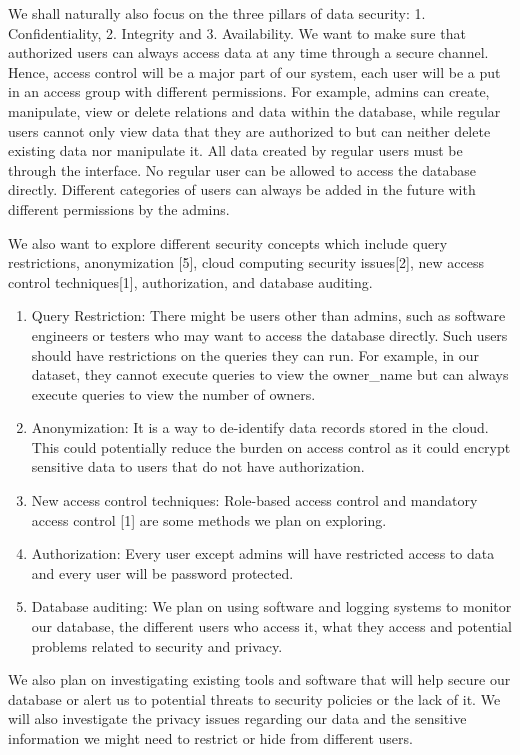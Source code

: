 \documentclass[sigconf]{acmart}
\begin{document}
We shall naturally also focus on the three pillars of data security: 1. Confidentiality, 2. Integrity and 3. Availability. We want to make sure that authorized users can always access data at any time through a secure channel. Hence, access control will be a major part of our system, each user will be a put in an access group with different permissions. For example, admins can create, manipulate, view or delete relations and data within the database, while regular users cannot only view data that they are authorized to but can neither delete existing data nor manipulate it. All data created by regular users must be through the interface. No regular user can be allowed to access the database directly. Different categories of users can always be added in the future with different permissions by the admins. 

We also want to explore different security concepts which include query restrictions, anonymization [5], cloud computing security issues[2], new access control techniques[1], authorization, and database auditing. 

\begin{enumerate}
    \item Query Restriction: There might be users other than admins, such as software engineers or testers who may want to access the database directly. Such users should have restrictions on the queries they can run. For example, in our dataset, they cannot execute queries to view the owner\_name but can always execute queries to view the number of owners.
    \item Anonymization: It is a way to de-identify data records stored in the cloud.  This could potentially reduce the burden on access control as it could encrypt sensitive data to users that do not have authorization.
    \item New access control techniques: Role-based access control and mandatory access control [1] are some methods we plan on exploring.
    \item Authorization: Every user except admins will have restricted access to data  and every user will be password protected.
    \item Database auditing: We plan on using software and logging systems to monitor our database, the different users who access it, what they access and potential problems related to security and privacy.
    
\end{enumerate}
We also plan on investigating existing tools and software that will help secure our database or alert us to potential threats to security policies or the lack of it.
We will also investigate the privacy issues regarding our data and the sensitive information we might need to restrict or hide from different users.
\end{document}
